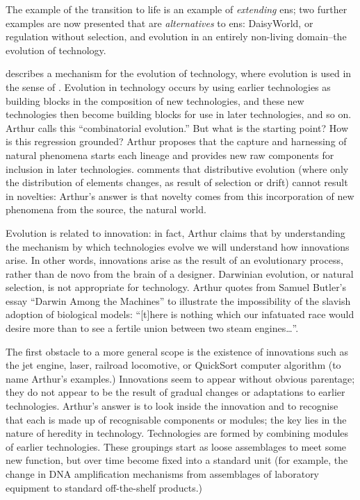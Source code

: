 The example of the transition to life is an example of \emph{extending} \gls{ens}; two further examples are now presented that are \emph{alternatives} to \gls{ens}: DaisyWorld, or regulation without selection, and evolution in an entirely non-living domain--the evolution of technology. 

\Textcite{Arthur2009} describes a mechanism for the evolution of technology, where evolution is used in the sense of . Evolution in technology occurs by using earlier technologies as building blocks in the composition of new technologies, and these new technologies then become building blocks for use in later technologies, and so on. Arthur calls this ``combinatorial evolution.'' But what is the starting point? How is this regression grounded? Arthur proposes that the capture and harnessing of natural phenomena starts each lineage and provides new raw components for inclusion in later technologies. \Textcite{Bourrat2015} comments that distributive evolution (where only the distribution of elements changes, as result of selection or drift) cannot result in novelties: Arthur's answer is that novelty comes from this incorporation of new phenomena from the source, the natural world.

Evolution is related to innovation: in fact, Arthur claims that by understanding the mechanism by which technologies evolve we will understand how innovations arise. In other words, innovations arise as the result of an evolutionary process, rather than de novo from the brain of a designer. Darwinian evolution, or natural selection, is not appropriate for technology. Arthur quotes from Samuel Butler's essay ``Darwin Among the Machines'' to illustrate the impossibility of the slavish adoption of biological models: ``{[}t{]}here is nothing which our infatuated race would desire more than to see a fertile union between two steam engines\ldots{}''.

The first obstacle to a more general scope is the existence of innovations such as the jet engine, laser, railroad locomotive, or QuickSort computer algorithm (to name Arthur's examples.) Innovations seem to appear without obvious parentage; they do not appear to be the result of gradual changes or adaptations to earlier technologies. Arthur's answer is to look inside the innovation and to recognise that each is made up of recognisable components or modules; the key lies in the nature of heredity in technology. Technologies are formed by combining modules of earlier technologies. These groupings start as loose assemblages to meet some new function, but over time become fixed into a standard unit (for example, the change in DNA amplification mechanisms from assemblages of laboratory equipment to standard off-the-shelf products.)

